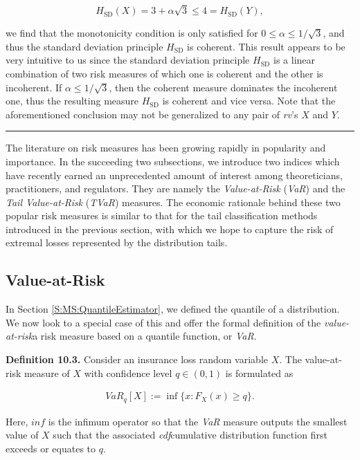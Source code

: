 \documentclass[]{book}
\theoremstyle{definition}
\theoremstyle{definition}
\theoremstyle{definition}
\theoremstyle{remark}
\begin{document}
\[
  H_{\mathrm{SD}}(X) = 3+\alpha\sqrt{3} \leq4= H_{\mathrm{SD}}(Y),
\]

we find that the monotonicity condition is only satisfied for
\(0\leq\alpha\leq 1/\sqrt{3}\), and thus the standard deviation
principle \(H_{\mathrm{SD}}\) is coherent. This result appears to be
very intuitive to us since the standard deviation principle
\(H_{\mathrm{SD}}\) is a linear combination of two risk measures of
which one is coherent and the other is incoherent. If
\(\alpha\leq 1/\sqrt{3}\), then the coherent measure dominates the
incoherent one, thus the resulting measure \(H_{\mathrm{SD}}\) is
coherent and vice versa. Note that the aforementioned conclusion may not
be generalized to any pair of \emph{rv}'s \(X\) and \(Y\).

\begin{center}\rule{0.5\linewidth}{\linethickness}\end{center}

The literature on risk measures has been growing rapidly in popularity
and importance. In the succeeding two subsections, we introduce two
indices which have recently earned an unprecedented amount of interest
among theoreticians, practitioners, and regulators. They are namely the
\emph{Value-at-Risk} (\emph{VaR}) and the \emph{Tail Value-at-Risk}
(\emph{TVaR}) measures. The economic rationale behind these two popular
risk measures is similar to that for the tail classification methods
introduced in the previous section, with which we hope to capture the
risk of extremal losses represented by the distribution tails.

\subsection{Value-at-Risk}\label{value-at-risk}

In Section \ref{S:MS:QuantileEstimator}, we defined the quantile of a
distribution. We now look to a special case of this and offer the formal
definition of the \emph{value-at-risk}{a risk measure based on a
quantile function}, or \emph{VaR}.

\textbf{Definition 10.3.} Consider an insurance loss random variable
\(X\). The value-at-risk measure of \(X\) with confidence level
\(q\in (0,1)\) is formulated as

\begin{eqnarray}
VaR_q[X]:=\inf\{x:F_X(x)\geq q\}.
\label{eq:Value-at-Risk}
\end{eqnarray}

Here, \(inf\) is the infimum operator so that the \emph{VaR} measure
outputs the smallest value of \(X\) such that the associated
\emph{cdf}{cumulative distribution function} first exceeds or equates to
\(q\).
\end{document}
